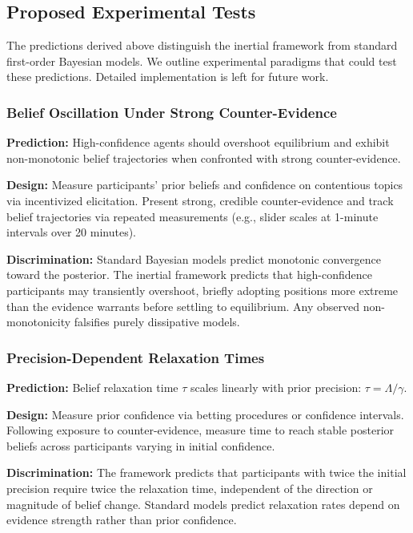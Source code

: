 \documentclass[12pt]{article}
\begin{document}
\subsection{Proposed Experimental Tests}

The predictions derived above distinguish the inertial framework from standard first-order Bayesian models. We outline experimental paradigms that could test these predictions. Detailed implementation is left for future work.

\subsubsection{Belief Oscillation Under Strong Counter-Evidence}

\textbf{Prediction:} High-confidence agents should overshoot equilibrium and exhibit non-monotonic belief trajectories when confronted with strong counter-evidence.

\textbf{Design:} Measure participants' prior beliefs and confidence on contentious topics via incentivized elicitation. Present strong, credible counter-evidence and track belief trajectories via repeated measurements (e.g., slider scales at 1-minute intervals over 20 minutes). 

\textbf{Discrimination:} Standard Bayesian models predict monotonic convergence toward the posterior. The inertial framework predicts that high-confidence participants may transiently overshoot, briefly adopting positions more extreme than the evidence warrants before settling to equilibrium. Any observed non-monotonicity falsifies purely dissipative models.

\subsubsection{Precision-Dependent Relaxation Times}

\textbf{Prediction:} Belief relaxation time $\tau$ scales linearly with prior precision: $\tau = \Lambda/\gamma$.

\textbf{Design:} Measure prior confidence via betting procedures or confidence intervals. Following exposure to counter-evidence, measure time to reach stable posterior beliefs across participants varying in initial confidence.

\textbf{Discrimination:} The framework predicts that participants with twice the initial precision require twice the relaxation time, independent of the direction or magnitude of belief change. Standard models predict relaxation rates depend on evidence strength rather than prior confidence.
\end{document}
